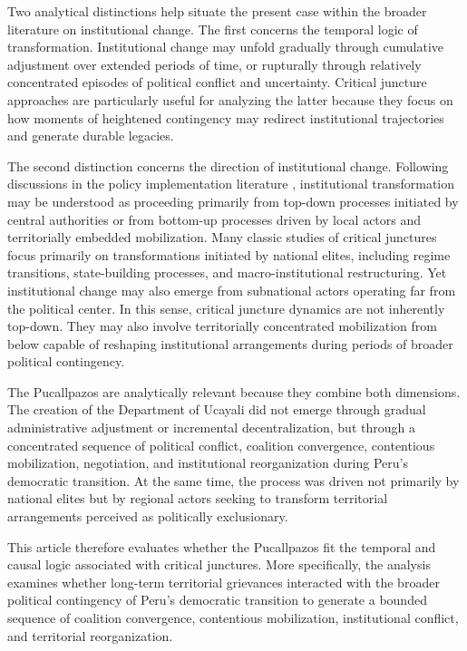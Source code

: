 \documentclass[12pt]{article}
\begin{document}
Two analytical distinctions help situate the present case within the broader literature on institutional change. The first concerns the temporal logic of transformation. Institutional change may unfold gradually through cumulative adjustment over extended periods of time, or rupturally through relatively concentrated episodes of political conflict and uncertainty. Critical juncture approaches are particularly useful for analyzing the latter because they focus on how moments of heightened contingency may redirect institutional trajectories and generate durable legacies.

The second distinction concerns the direction of institutional change. Following discussions in the policy implementation literature \parencite{sabatier_top-down_1986}, institutional transformation may be understood as proceeding primarily from top-down processes initiated by central authorities or from bottom-up processes driven by local actors and territorially embedded mobilization. Many classic studies of critical junctures focus primarily on transformations initiated by national elites, including regime transitions, state-building processes, and macro-institutional restructuring. Yet institutional change may also emerge from subnational actors operating far from the political center. In this sense, critical juncture dynamics are not inherently top-down. They may also involve territorially concentrated mobilization from below capable of reshaping institutional arrangements during periods of broader political contingency.

The Pucallpazos are analytically relevant because they combine both dimensions. The creation of the Department of Ucayali did not emerge through gradual administrative adjustment or incremental decentralization, but through a concentrated sequence of political conflict, coalition convergence, contentious mobilization, negotiation, and institutional reorganization during Peru’s democratic transition. At the same time, the process was driven not primarily by national elites but by regional actors seeking to transform territorial arrangements perceived as politically exclusionary.

This article therefore evaluates whether the Pucallpazos fit the temporal and causal logic associated with critical junctures. More specifically, the analysis examines whether long-term territorial grievances interacted with the broader political contingency of Peru’s democratic transition to generate a bounded sequence of coalition convergence, contentious mobilization, institutional conflict, and territorial reorganization.
\end{document}
